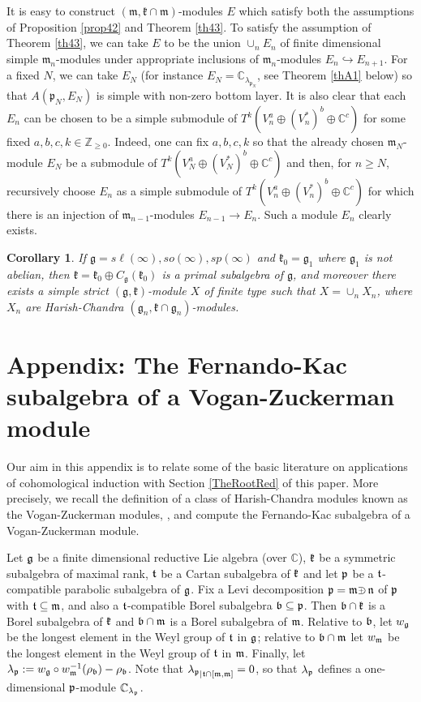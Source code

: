 \documentclass[12pt]{article}
\newcounter{theorem}
\newtheorem{corollary}[theo]{Corollary}
\newcommand {\ZZ} {\mathbb {Z}}
\newcommand {\CC} {\mathbb {C}}
\newcommand{\kk}{\mathfrak{k}}
\newcommand{\mm}{\mathfrak{m}}
\newcommand{\pp}{\mathfrak{p}}
\renewcommand{\gg}{\mathfrak{g}}
\newcommand{\refth}[1]{Theorem \ref{#1}}
\newcommand{\refsec}[1]{Section \ref{#1}}
\newcommand{\refprop}[1]{Proposition \ref{#1}}
\renewcommand{\sp}{{sp}}
\renewcommand{\sl}{{s\ell}}
\newcommand{\so}{{so}}
\def\crplus{\hbox{$\supset${\raise1.05pt\hbox{\kern -0.72em ${\scriptscriptstyle +}$}}\ }}
\def\p{\bold p}
\def\p{\bold p}
\def\m{\frak m}
\def\p{\frak p}
\def\g{\frak g}
\def\b{\frak b}
\begin{document}
It is easy to construct $(\mm,\kk\cap\mm)$-modules $E$ which satisfy both the assumptions of \refprop{prop42} and \refth{th43}. To satisfy the assumption of \refth{th43}, we can take $E$ to be the union $\cup_n E_n$ of finite dimensional simple $\mm_n$-modules under appropriate inclusions of $\mm_n$-modules $E_n\hookrightarrow E_{n+1}$. For a fixed $N$, we can take $E_{N}$ (for instance $E_N=\CC_{\lambda_{\pp_N}}$, see \refth{thA1} below) so that $A(\pp_{N}, E_{N})$ is simple with non-zero bottom layer. It is also clear that each $E_n$ can be chosen to be a simple submodule of $T^k(V_n^a\oplus(V_n^*)^b\oplus\CC^c)$ for some fixed $a,b,c,k\in\ZZ_{\geq 0}$. Indeed, one can fix $a,b,c,k$ so that the already chosen $\mm_N$-module $E_{N}$ be a submodule of $T^k(V_N^a\oplus(V_N^*)^b\oplus\CC^c)$ and then, for $n\geq N$, recursively choose $E_n$ as a simple submodule of $T^k(V_n^a\oplus(V_n^*)^b\oplus\CC^c)$ for which there is an injection of $\mm_{n-1}$-modules $E_{n-1}\to E_n$. Such a module $E_n$ clearly exists.

\begin{corollary}\label{cor44}
If $\gg=\sl(\infty),\so(\infty),\sp(\infty)$ and $\kk_0=\gg_1$ where $\gg_1$ is not abelian, then $\kk=\kk_0\oplus C_\gg(\kk_0)$ is a primal subalgebra of $\gg$, and moreover there exists a simple strict $(\gg,\kk)$-module $X$ of finite type such that $X=\cup_n X_n$, where $X_n$ are Harish-Chandra $(\gg_n,\kk\cap\gg_n)$-modules.
\end{corollary}

\section{Appendix: The Fernando-Kac subalgebra of a Vogan-Zuckerman module}

Our aim in this appendix is to relate some of the basic literature on applications of cohomological induction with \refsec{TheRootRed} of this paper. More precisely, we recall the definition of a class of Harish-Chandra modules known as the Vogan-Zuckerman modules, \cite{VZ}, and compute the Fernando-Kac subalgebra of a Vogan-Zuckerman module.

Let $\frak g$ be a finite dimensional reductive Lie algebra (over $\CC$), $\frak k$ be a symmetric subalgebra of maximal rank, $\frak t$ be a Cartan subalgebra of $\frak k$ and let $\frak p$ be a $\frak t$-compatible parabolic subalgebra of $\frak g$.  Fix a Levi decomposition $\frak p = \frak m \crplus \frak n$ of $\frak p$ with $\frak t\subseteq\frak m$, and also a $\frak t$-compatible Borel subalgebra $\frak b\subseteq \frak p$. Then $\frak b\cap\frak k$ is a Borel subalgebra of $\frak k$ and $\frak b\cap\frak m$ is a Borel subalgebra of $\frak m$.  Relative to $\frak b$, let $w_\frak g$ be the longest element in the Weyl group of $\frak t$ in $\frak g$; relative to $\frak b\cap\frak m$ let $w_\frak m$ be the longest element in the Weyl group of $\frak t$ in $\frak m$. Finally, let $\lambda_\p := w_\g \circ w^{-1}_\m (\rho_\b) - \rho_\b$.  Note that ${\lambda_\p}_{\mid \frak t\cap[\m, \m]} = 0$, so that $\lambda_\p$ defines a one-dimensional $\p$-module $\CC_{\lambda_{\p}}$.
\end{document}
